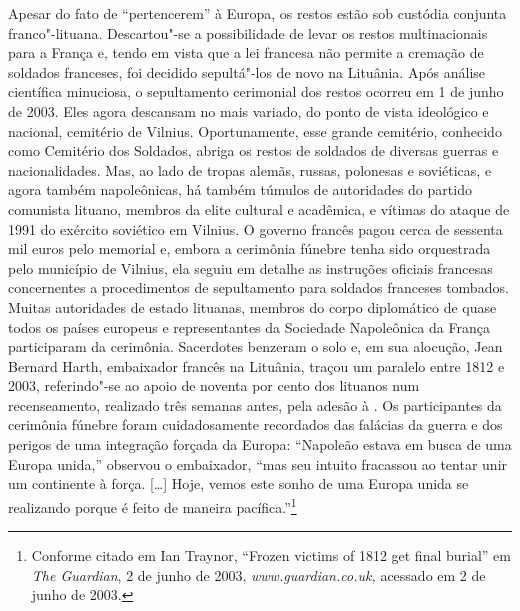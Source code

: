 Apesar do fato de ``pertencerem'' à Europa, os restos estão sob custódia
conjunta franco"-lituana. Descartou"-se a possibilidade de levar os restos
multinacionais para a França e, tendo em vista que a lei francesa não
permite a cremação de soldados franceses, foi decidido sepultá"-los de
novo na Lituânia. Após análise científica minuciosa, o sepultamento
cerimonial dos restos ocorreu em 1 de junho de 2003. Eles agora
descansam no mais variado, do ponto de vista ideológico e nacional,
cemitério de Vilnius. Oportunamente, esse grande cemitério, conhecido
como Cemitério dos Soldados, abriga os restos de soldados de diversas
guerras e nacionalidades. Mas, ao lado de tropas alemãs, russas,
polonesas e soviéticas, e agora também napoleônicas, há também túmulos
de autoridades do partido comunista lituano, membros da elite cultural e
acadêmica, e vítimas do ataque de 1991 do exército soviético em Vilnius.
O governo francês pagou cerca de sessenta mil euros pelo memorial e,
embora a cerimônia fúnebre tenha sido orquestrada pelo município de
Vilnius, ela seguiu em detalhe as instruções oficiais francesas
concernentes a procedimentos de sepultamento para soldados franceses
tombados. Muitas autoridades de estado lituanas, membros do corpo
diplomático de quase todos os países europeus e representantes da
Sociedade Napoleônica da França participaram da cerimônia. Sacerdotes
benzeram o solo e, em sua alocução, Jean Bernard Harth, embaixador
francês na Lituânia, traçou um paralelo entre 1812 e 2003, referindo"-se
ao apoio de noventa por cento dos lituanos num recenseamento, realizado
três semanas antes, pela adesão à . Os participantes da cerimônia
fúnebre foram cuidadosamente recordados das falácias da guerra e dos
perigos de uma integração forçada da Europa: ``Napoleão estava em busca
de uma Europa unida,'' observou o embaixador, ``mas seu intuito
fracassou ao tentar unir um continente à força. [\ldots{}] Hoje, vemos
este sonho de uma Europa unida se realizando porque é feito de maneira
pacífica.''\footnote{Conforme citado em Ian Traynor, ``Frozen victims of 1812 get final burial'' em \textit{The Guardian}, 2 de junho de 2003, \textit{www.guardian.co.uk,} acessado em 2 de junho de 2003.}

